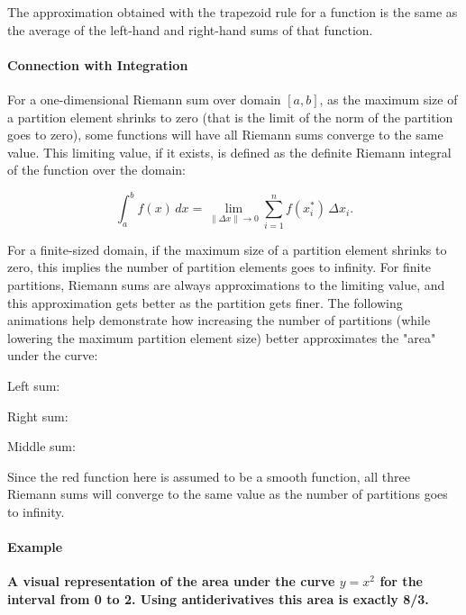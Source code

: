 The approximation obtained with the trapezoid rule for a function is the same as the average of the left-hand and right-hand sums of that function.



\paragraph{Connection with Integration}



For a one-dimensional Riemann sum over domain $[a,b]$, as the maximum size of a partition element shrinks to zero (that is the limit of the norm of the partition goes to zero), some functions will have all Riemann sums converge to the same value. This limiting value, if it exists, is defined as the definite Riemann integral of the function over the domain:



$$\int_a^b f(x) \, dx = \lim_{\|\Delta x\|\rightarrow0} \sum_{i=1}^{n} f(x_i^*) \,\Delta x_i.$$



For a finite-sized domain, if the maximum size of a partition element shrinks to zero, this implies the number of partition elements goes to infinity. For finite partitions, Riemann sums are always approximations to the limiting value, and this approximation gets better as the partition gets finer. The following animations help demonstrate how increasing the number of partitions (while lowering the maximum partition element size) better approximates the "area" under the curve:



Left sum: %

Right sum: %

Middle sum: %



Since the red function here is assumed to be a smooth function, all three Riemann sums will converge to the same value as the number of partitions goes to infinity.



\paragraph{Example}




\textbf{A visual representation of the area under the curve $y = x^2$ for the interval from 0 to 2. Using antiderivatives this area is exactly 8/3.}



